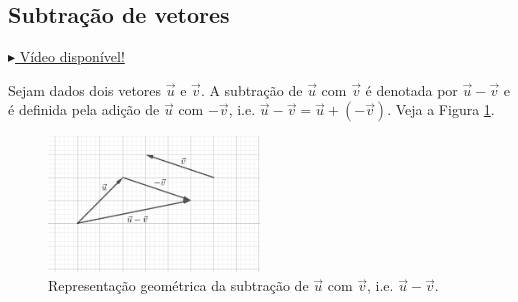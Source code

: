 \subsection{Subtração de vetores}

\begin{flushright}
  \href{https://archive.org/details/subtracao-de-vetores}{$\blacktriangleright$ Vídeo disponível!}
\end{flushright}

Sejam dados dois vetores $\vec{u}$ e $\vec{v}$. A subtração de $\vec{u}$ com $\vec{v}$ é denotada por $\vec{u}-\vec{v}$ e é definida pela adição de $\vec{u}$ com $-\vec{v}$, i.e. $\vec{u}-\vec{v}=\vec{u}+(-\vec{v})$. Veja a Figura \ref{fig:vsubtracao}.

\begin{figure}[H]
  \centering
  \includegraphics[width=0.5\textwidth]{./cap_vetor/dados/fig_vsubtracao/fig_vsubtracao}
  \caption{Representação geométrica da subtração de $\vec{u}$ com $\vec{v}$, i.e. $\vec{u}-\vec{v}$.}
  \label{fig:vsubtracao}
\end{figure}

